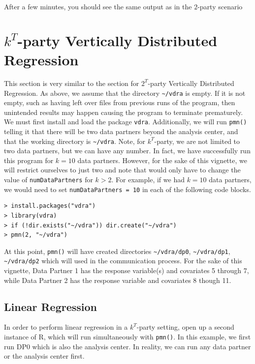 \documentclass[12]{article}
\begin{document}
After a few minutes, you should see the same output as in the $2$-party scenario


\section{$k^T$-party Vertically Distributed Regression}

This section is very similar to the section for $2^T$-party Vertically Distributed Regression.  As above, we assume that the directory \verb"~/vdra" is empty.  If it is not empty, such as having left over files from previous runs of the program, then unintended results may happen causing the program to terminate prematurely.  We must first install and load the package \verb"vdra".  Additionally, we will run \verb"pmn()" telling it that there will be two data partners beyond the analysis center, and that the working directory is \verb"~/vdra".  Note, for $k^T$-party, we are not limited to two data partners, but we can have any number.  In fact, we have successfully run this program for $k = 10$ data partners.  However, for the sake of this vignette, we will restrict ourselves to just two and note that would only have to change the value of \verb"numDataPartners" for $k > 2$. For example, if we had $k = 10$ data partners, we would need to set \verb"numDataPartners = 10" in each of the following code blocks.

\begin{verbatim}
> install.packages("vdra")
> library(vdra)
> if (!dir.exists("~/vdra")) dir.create("~/vdra")
> pmn(2, "~/vdra")
\end{verbatim}

At this point, \verb"pmn()" will have created directories \verb"~/vdra/dp0", \verb"~/vdra/dp1", \verb"~/vdra/dp2" which will used in the communication process.  For the sake of this vignette, Data Partner 1 has the response variable(s) and covariates 5 through 7, while Data Partner 2 has the response variable and covariates 8 though 11.

\subsection{Linear Regression}

In order to perform linear regression in a $k^T$-party setting, open up a second instance of R, which will run simultaneously with \verb"pmn()".  In this example, we first run DP0 which is also the analysis center.  In reality, we can run any data partner or the analysis center first.
\end{document}
